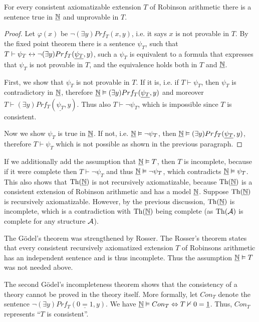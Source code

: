 \begin{theorem}
For every consistent axiomatizable extension $T$ of Robinson arithmetic there is a sentence true in $\underline{\mathbb{N}}$ and unprovable in $T$.
\end{theorem}
\begin{proof}
Let $\varphi(x)$ be $\neg (\exists y)Prf_T(x, y)$, i.e. it says $x$ is not provable in $T$. By the fixed point theorem there is a sentence $\psi_T$, such that $T \vdash \psi_T \leftrightarrow \neg (\exists y)Prf_T(\underline{\psi_T}, y)$, such a $\psi_T$ is equivalent to a formula that expresses that $\psi_T$ is not provable in $T$, and the equivalence holds both in $T$ and $\underline{\mathbb{N}}$. 

First, we show that $\psi_T$ is not provable in $T$. If it is, i.e. if $T \vdash \psi_T$, then $\psi_T$ is contradictory in $\underline{\mathbb{N}}$, therefore $\underline{\mathbb{N}} \vDash (\exists y)Prf_T(\underline{\psi_T}, y)$ and moreover $T \vdash (\exists y)Prf_T(\underline{\psi_T}, y)$. Thus also $T \vdash \neg \psi_T$, which is impossible since $T$ is consistent.

Now we show $\psi_T$ is true in $\underline{\mathbb{N}}$. If not, i.e. $\underline{\mathbb{N}} \vDash \neg \psi_T$, then $\underline{\mathbb{N}} \vDash (\exists y)Prf_T(\underline{\psi_T}, y)$, therefore $T \vdash \psi_T$ which is not possible as shown in the previous paragraph.
\end{proof}

If we additionally add the assumption that $\underline{\mathbb{N}} \vDash T$, then $T$ is incomplete, because if it were complete then $T \vdash \neg \psi_T$ and thus $\underline{\mathbb{N}} \vDash \neg \psi_T$, which contradicts $\underline{\mathbb{N}} \vDash \psi_T$. This also shows that $\operatorname{Th}(\underline{\mathbb{N}})$ is not recursively axiomatizable, because $\operatorname{Th}(\underline{\mathbb{N}})$ is a consistent extension of Robinson arithmetic and has a model $\underline{\mathbb{N}}$. Suppose $\operatorname{Th}(\underline{\mathbb{N}})$ is recursively axiomatizable. However, by the previous discussion, $\operatorname{Th}(\underline{\mathbb{N}})$ is incomplete, which is a contradiction with $\operatorname{Th}(\underline{\mathbb{N}})$ being complete (as $\operatorname{Th}(\mathcal{A})$ is complete for any structure $\mathcal{A}$).

The Gödel's theorem was strengthened by Rosser. The Rosser's theorem states that every consistent recursively axiomatized extension $T$ of Robinsons arithmetic has an independent sentence and is thus incomplete. Thus the assumption $\underline{\mathbb{N}} \vDash T$ was not needed above.

The second Gödel's incompleteness theorem shows that the consistency of a theory cannot be proved in the theory itself. More formally, let $Con_T$ denote the sentence $\neg (\exists y)Prf_T(\underline{0 = 1}, y)$. We have $\underline{\mathbb{N}} \vDash Con_T \Leftrightarrow T \nvdash 0 = \underline{1}$. Thus, $Con_T$ represents ``$T$ is consistent''.

